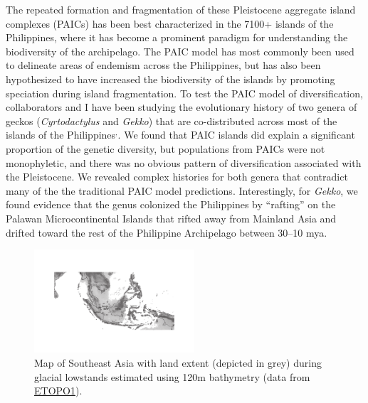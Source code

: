 \documentclass[10pt]{article}
\newcommand{\super}[1]{\ensuremath{^{\textrm{#1}}}}
\begin{document}
The repeated formation and fragmentation of these Pleistocene aggregate island
complexes (PAICs) has been best characterized in the 7100+ islands of the
Philippines, where it has become a prominent paradigm for understanding the
biodiversity of the archipelago.
The PAIC model has most commonly been used to delineate areas of endemism
across the Philippines, but has also been hypothesized to have increased the
biodiversity of the islands by promoting speciation during island
fragmentation.
To test the PAIC model of diversification, collaborators and
I have been studying the evolutionary history of two genera of geckos
(\emph{Cyrtodactylus} and \emph{Gekko}) that are co-distributed across most of
the islands of the
Philippines\super{,}.
We found that PAIC islands did explain a significant proportion of the genetic
diversity, but populations from PAICs were not monophyletic, and there was no
obvious pattern of diversification associated with the Pleistocene.
We revealed complex histories for both genera that contradict many of the the
traditional PAIC model predictions.
Interestingly, for \emph{Gekko}, we found evidence that the genus colonized the
Philippines by ``rafting'' on the Palawan Microcontinental Islands that rifted
away from Mainland Asia and drifted toward the rest of the Philippine
Archipelago between 30--10 mya.

\begin{figure}
  \vspace{-1.5em}
  \begin{center}
    \includegraphics[width=0.53\textwidth]{sunda_shelf_small.pdf}
  \end{center}
  \vspace{-0.2em}
  \caption{Map of Southeast Asia with land extent (depicted in grey) during
  glacial lowstands estimated using 120m bathymetry (data from
  \href{http://ngdc.noaa.gov/mgg/global/global.html}{ETOPO1}).}
  \label{map}
  \vspace{-1.1em}
\end{figure}
\end{document}
